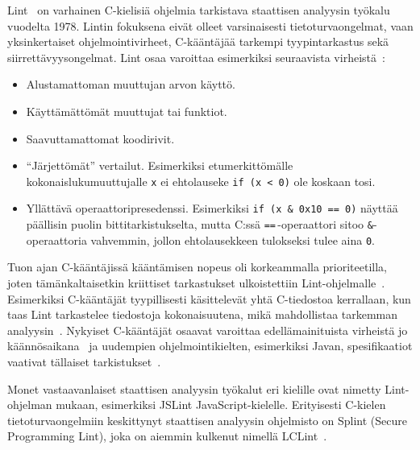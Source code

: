 
Lint~\cite{Lint} on varhainen C-kielisiä ohjelmia tarkistava staattisen analyysin työkalu vuodelta 1978.
Lintin fokuksena eivät olleet varsinaisesti tietoturvaongelmat,
vaan yksinkertaiset ohjelmointivirheet, C-kääntäjää tarkempi tyypintarkastus sekä siirrettävyysongelmat.
Lint osaa varoittaa esimerkiksi seuraavista virheistä~\cite{Lint}:

\begin{itemize}
    \item Alustamattoman muuttujan arvon käyttö.
    \item Käyttämättömät muuttujat tai funktiot.
    \item Saavuttamattomat koodirivit.
    \item ``Järjettömät'' vertailut.
           Esimerkiksi etumerkittömälle kokonaislukumuuttujalle \texttt{x} ei ehtolauseke
           \texttt{if (x < 0)} ole koskaan tosi.
   \item Yllättävä operaattoripresedenssi.
         Esimerkiksi \texttt{if (x \& 0x10 == 0)} näyttää päällisin puolin bittitarkistukselta,
         mutta C:ssä \texttt{==}\,-operaattori sitoo \texttt{\&}-operaattoria vahvemmin,
         jollon ehtolausekkeen tulokseksi tulee aina \texttt{0}.
\end{itemize}

Tuon ajan C-kääntäjissä kääntämisen nopeus oli korkeammalla prioriteetilla,
joten tämänkaltaisetkin kriittiset tarkastukset ulkoistettiin Lint-ohjelmalle~\cite{Lint}.
Esimerkiksi C-kääntäjät tyypillisesti käsittelevät yhtä C-tiedostoa kerrallaan,
kun taas Lint tarkastelee tiedostoja kokonaisuutena,
mikä mahdollistaa tarkemman analyysin~\cite{Lint}.
Nykyiset C-kääntäjät osaavat varoittaa e\-del\-lä\-mai\-ni\-tuis\-ta virheistä
jo käännösaikana~\cite{SecurityRootOfTheProblem} ja uudempien ohjelmointikielten,
esimerkiksi Javan, spesifikaatiot vaativat tällaiset tarkistukset~\cite[22.3]{Sommerville}.

Monet vastaavanlaiset staattisen analyysin työkalut eri kielille ovat nimetty
Lint-ohjelman mukaan, esimerkiksi JSLint JavaScript-kielelle.
Erityisesti C-kielen tietoturvaongelmiin keskittynyt staattisen analyysin ohjelmisto on Splint
(Secure Programming Lint), joka on aiemmin kulkenut nimellä LCLint~\cite{SplintLCLint}.

